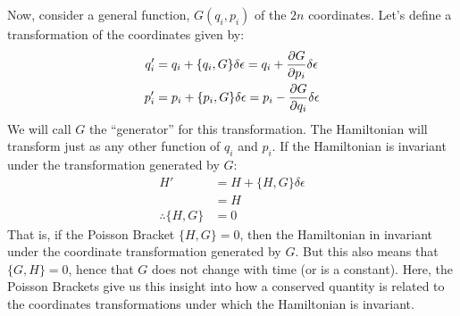 Now, consider a general function, $G(q_i,p_i)$ of the $2n$ coordinates. Let's define a transformation of the coordinates given by:
\begin{align}
q_i'&=q_i+\{q_i,G\}\delta\epsilon=q_i+\frac{\partial G}{\partial p_i}\delta\epsilon  \nonumber\\
p_i'&=p_i+\{p_i,G\}\delta\epsilon=p_i-\frac{\partial G}{\partial q_i}\delta\epsilon
\end{align}
We will call $G$ the ``generator'' for this transformation. The Hamiltonian will transform just as any other function of $q_i$ and $p_i$. If the Hamiltonian is invariant under the transformation generated by $G$:
\begin{align}
H'&=H+\{H,G\}\delta\epsilon\nonumber\\
&=H \nonumber\\
\therefore \{H,G\}&=0
\end{align}
That is, if the Poisson Bracket $\{H,G\}=0$, then the Hamiltonian in invariant under the coordinate transformation generated by $G$. But this also means that $\{G,H\}=0$, hence that $G$ does not change with time (or is a constant). Here, the Poisson Brackets give us this insight into how a conserved quantity is related to the coordinates transformations under which the Hamiltonian is invariant.